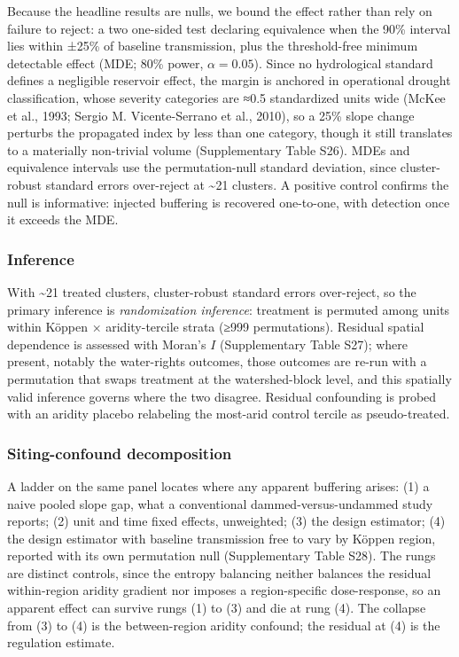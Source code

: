 \documentclass[
]{agujournal2019}
\begin{document}
Because the headline results are nulls, we bound the effect rather than
rely on failure to reject: a two one-sided test declaring equivalence
when the 90\% interval lies within ±25\% of baseline transmission, plus
the threshold-free minimum detectable effect (MDE; 80\% power,
\(\alpha = 0.05\)). Since no hydrological standard defines a negligible
reservoir effect, the margin is anchored in operational drought
classification, whose severity categories are ≈0.5 standardized units
wide (McKee et al., 1993; Sergio M. Vicente-Serrano et al., 2010), so a
25\% slope change perturbs the propagated index by less than one
category, though it still translates to a materially non-trivial volume
(Supplementary Table S26). MDEs and equivalence intervals use the
permutation-null standard deviation, since cluster-robust standard
errors over-reject at \textasciitilde21 clusters. A positive control
confirms the null is informative: injected buffering is recovered
one-to-one, with detection once it exceeds the MDE.

\subsubsection{Inference}\label{inference}

With \textasciitilde21 treated clusters, cluster-robust standard errors
over-reject, so the primary inference is \emph{randomization inference}:
treatment is permuted among units within Köppen × aridity-tercile strata
(≥999 permutations). Residual spatial dependence is assessed with
Moran's \(I\) (Supplementary Table S27); where present, notably the
water-rights outcomes, those outcomes are re-run with a permutation that
swaps treatment at the watershed-block level, and this spatially valid
inference governs where the two disagree. Residual confounding is probed
with an aridity placebo relabeling the most-arid control tercile as
pseudo-treated.

\subsubsection{Siting-confound
decomposition}\label{siting-confound-decomposition}

A ladder on the same panel locates where any apparent buffering arises:
(1) a naive pooled slope gap, what a conventional dammed-versus-undammed
study reports; (2) unit and time fixed effects, unweighted; (3) the
design estimator; (4) the design estimator with baseline transmission
free to vary by Köppen region, reported with its own permutation null
(Supplementary Table S28). The rungs are distinct controls, since the
entropy balancing neither balances the residual within-region aridity
gradient nor imposes a region-specific dose-response, so an apparent
effect can survive rungs (1) to (3) and die at rung (4). The collapse
from (3) to (4) is the between-region aridity confound; the residual at
(4) is the regulation estimate.
\end{document}
